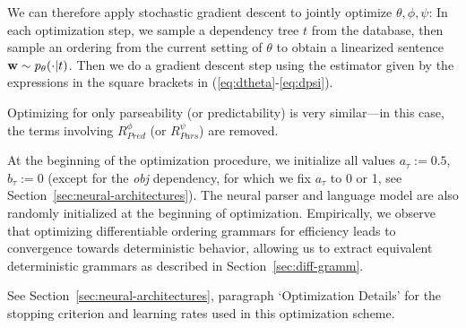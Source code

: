 \documentclass[10pt,twoside,lineno]{article}
\DeclareMathOperator{\E}{\mathop{\mathbb{E}}}
\begin{document}
We can therefore apply stochastic gradient descent to jointly optimize $\theta, \phi, \psi$:
In each optimization step, we sample a dependency tree $t$ from the database, then sample an ordering from the current setting of $\theta$ to obtain a linearized sentence ${\bf w} \sim p_{\theta}(\cdot|t)$.
Then we %
do a gradient descent step using the estimator given by the expressions in the square brackets in (\ref{eq:dtheta}-\ref{eq:dpsi}).


Optimizing for only parseability (or predictability) is very similar---in this case, the terms involving $R_{Pred}^\phi$ (or $R_{Pars}^\psi$) are removed.


At the beginning of the optimization procedure, we initialize all values $a_\tau := 0.5$, $b_\tau := 0$ (except for the \emph{obj} dependency, for which we fix $a_\tau$ to 0 or 1, see Section~\ref{sec:neural-architectures}).
The neural parser and language model are also randomly initialized at the beginning of optimization.
Empirically, we observe that optimizing differentiable ordering grammars for efficiency leads to convergence towards deterministic behavior, allowing us to extract equivalent deterministic grammars as described in Section~\ref{sec:diff-gramm}.

See Section~\ref{sec:neural-architectures}, paragraph `Optimization Details' for the stopping criterion and learning rates used in this optimization scheme.



%
%
\end{document}
